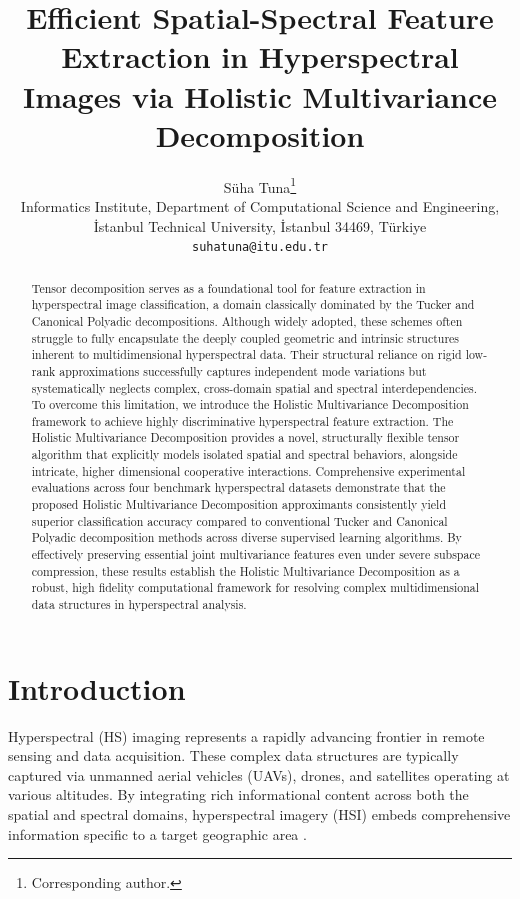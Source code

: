 \documentclass[12pt,onecolumn]{article}
\title{Efficient Spatial-Spectral Feature Extraction in Hyperspectral Images via Holistic Multivariance Decomposition}
\author{
 \begin{tabular}{c}
    Süha Tuna\thanks{Corresponding author.} \\
    \small Informatics Institute, Department of Computational Science and Engineering,  \\
    \small \.Istanbul Technical University, \.Istanbul 34469, T\"urkiye \\
    \small \texttt{suhatuna@itu.edu.tr}
  \end{tabular}
}
\date{}
\begin{document}
\maketitle

\begin{abstract}
Tensor decomposition serves as a foundational tool for feature extraction in hyperspectral image classification, a domain classically dominated by the Tucker and Canonical Polyadic decompositions. Although widely adopted, these schemes often struggle to fully encapsulate the deeply coupled geometric and intrinsic  structures inherent to multidimensional hyperspectral data. Their structural reliance on rigid low-rank approximations successfully captures independent mode variations but systematically neglects complex, cross-domain spatial and spectral interdependencies. To overcome this limitation, we introduce the Holistic Multivariance Decomposition framework to achieve highly discriminative hyperspectral feature extraction. The Holistic Multivariance Decomposition provides a novel, structurally flexible tensor algorithm that explicitly models isolated spatial and spectral behaviors, alongside intricate, higher dimensional cooperative interactions. Comprehensive experimental evaluations across four benchmark hyperspectral datasets demonstrate that the proposed Holistic Multivariance Decomposition approximants consistently yield superior classification accuracy compared to conventional Tucker and Canonical Polyadic decomposition methods across diverse supervised learning algorithms. By effectively preserving essential joint multivariance features even under severe subspace compression, these results establish the Holistic Multivariance Decomposition as a robust, high fidelity computational framework for resolving complex multidimensional data structures in hyperspectral analysis.
\end{abstract}


\section{Introduction}
\label{sec:intro}

Hyperspectral (HS) imaging represents a rapidly advancing frontier in remote sensing and data acquisition. These complex data structures are typically captured via unmanned aerial vehicles (UAVs), drones, and satellites operating at various altitudes. By integrating rich informational content across both the spatial and spectral domains, hyperspectral imagery (HSI) embeds comprehensive information specific to a target geographic area \cite{hsi_overview}.
\end{document}
